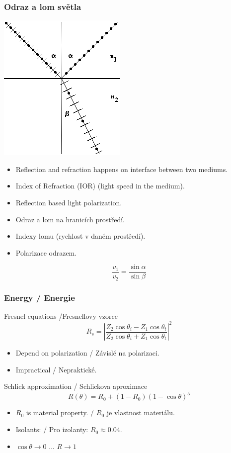 \begin{frame}\frametitle{Odraz a lom světla}
  \includegraphics[width=.3\textwidth]{pics/physicallyBasedRendering/image106}
  \scriptsize
  \begin{itemize}
    \item Reflection and refraction happens on interface between two mediums.
    \item Index of Refraction (IOR) (light speed in the medium).
    \item Reflection based light polarization.
  \end{itemize}
  \begin{itemize}
    \item Odraz a lom na hranicích prostředí.
    \item Indexy lomu (rychlost v daném prostředí).
    \item Polarizace odrazem.
  \end{itemize}
  \begin{equation*}
    \frac{v_1}{v_2} = \frac{\sin\alpha}{\sin\beta}
  \end{equation*}
\end{frame}

\begin{frame}\frametitle{Energy / Energie}
    Fresnel equations /Fresnellovy vzorce
    \begin{equation*}
        R_s = \left| \frac{Z_2 \cos \theta_i - Z_1 \cos \theta_t}{Z_2 \cos \theta_i + Z_1 \cos \theta_t} \right|^2
    \end{equation*}
    \begin{itemize}
        \item Depend on polarization / Závislé na polarizaci.
        \item Impractical / Nepraktické.
    \end{itemize}
    \pause\vfill
    Schlick approximation / Schlickova aproximace
    \begin{equation*}
        R(\theta) = R_0 + (1-R_0)(1-\cos\theta)^5
    \end{equation*}
    \begin{itemize}
        \item $R_0$ is material property. / $R_0$ je vlastnost materiálu.
        \item Isolants: / Pro izolanty: $R_0 \approx 0.04$.
        \item $\cos\theta \rightarrow 0$ ... $R \rightarrow 1$
    \end{itemize}
\end{frame}

